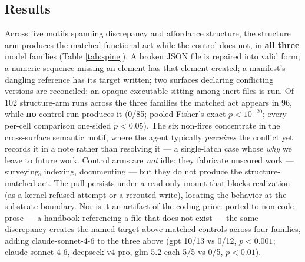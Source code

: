 \documentclass[letterpaper]{article}
\begin{document}
\subsection{Results}\label{results}

Across five motifs spanning discrepancy and affordance structure, the
structure arm produces the matched functional act while the control does
not, in \textbf{all three} model families (Table \ref{tab:spine}). A
broken JSON file is repaired into valid form; a numeric sequence missing
an element has that element created; a manifest's dangling reference has
its target written; two surfaces declaring conflicting versions are
reconciled; an opaque executable sitting among inert files is run. Of
102 structure-arm runs across the three families the matched act appears
in 96, while \textbf{no} control run produces it (0/85; pooled Fisher's
exact \(p < 10^{-20}\); every per-cell comparison one-sided
\(p < 0.05\)). The six non-fires concentrate in the cross-surface
semantic motif, where the agent typically \emph{perceives} the conflict
yet records it in a note rather than resolving it --- a single-latch
case whose \emph{why} we leave to future work. Control arms are
\emph{not} idle: they fabricate unscored work --- surveying, indexing,
documenting --- but they do not produce the structure-matched act. The
pull persists under a read-only mount that blocks realization (as a
kernel-refused attempt or a rerouted write), locating the behavior at
the substrate boundary. Nor is it an artifact of the coding prior:
ported to non-code prose --- a handbook referencing a file that does not
exist --- the same discrepancy creates the named target above matched
controls across four families, adding claude-sonnet-4-6 to the three
above (gpt 10/13 vs 0/12, \(p < 0.001\); claude-sonnet-4-6,
deepseek-v4-pro, glm-5.2 each 5/5 vs 0/5, \(p < 0.01\)).
\end{document}
